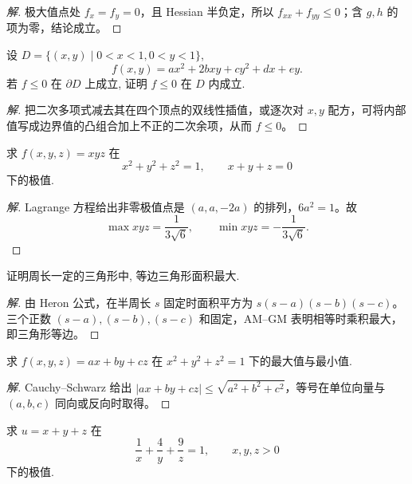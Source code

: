 \documentclass[../../数学分析培优讲义(答案版).tex]{subfiles}
\begin{document}
\begin{proof}[解]
极大值点处 $f_x=f_y=0$，且 Hessian 半负定，所以 $f_{xx}+f_{yy}\leq0$；含 $g,h$ 的项为零，结论成立。
\end{proof}

\begin{example}
设 $D=\{(x,y)\mid0<x<1,0<y<1\}$,
\[
    f(x,y)=ax^2+2bxy+cy^2+dx+ey.
\]
若 $f\leq0$ 在 $\partial D$ 上成立, 证明 $f\leq0$ 在 $D$ 内成立.
\end{example}

\begin{proof}[解]
把二次多项式减去其在四个顶点的双线性插值，或逐次对 $x,y$ 配方，可将内部值写成边界值的凸组合加上不正的二次余项，从而 $f\leq0$。
\end{proof}


\begin{example}
求 $f(x,y,z)=xyz$ 在
\[
    x^2+y^2+z^2=1,
    \qquad x+y+z=0
\]
下的极值.
\end{example}

\begin{proof}[解]
Lagrange 方程给出非零极值点是 $(a,a,-2a)$ 的排列，$6a^2=1$。故
\[
\max xyz=\dfrac{1}{3\sqrt{6}},\qquad
\min xyz=-\dfrac{1}{3\sqrt{6}}.
\]
\end{proof}

\begin{example}
证明周长一定的三角形中, 等边三角形面积最大.
\end{example}

\begin{proof}[解]
由 Heron 公式，在半周长 $s$ 固定时面积平方为 $s(s-a)(s-b)(s-c)$。三个正数 $(s-a),(s-b),(s-c)$ 和固定，AM--GM 表明相等时乘积最大，即三角形等边。
\end{proof}

\begin{example}
求 $f(x,y,z)=ax+by+cz$ 在 $x^2+y^2+z^2=1$ 下的最大值与最小值.
\end{example}

\begin{proof}[解]
Cauchy--Schwarz 给出 $|ax+by+cz|\leq\sqrt{a^2+b^2+c^2}$，等号在单位向量与 $(a,b,c)$ 同向或反向时取得。
\end{proof}

\begin{example}
求 $u=x+y+z$ 在
\[
    \dfrac{1}{x}+\dfrac{4}{y}+\dfrac{9}{z}=1,
    \qquad x,y,z>0
\]
下的极值.
\end{example}
\end{document}
